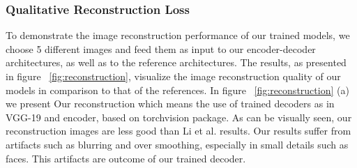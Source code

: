 \subsubsection{Qualitative Reconstruction Loss}
To demonstrate the image reconstruction performance of our trained models, we choose 5 different images and feed them as input to our encoder-decoder architectures, as well as to the reference architectures. The results, as presented in figure ~\ref{fig:reconstruction}, visualize the image reconstruction quality of our models in comparison to that of the references.\newline
In figure ~\ref{fig:reconstruction} (a) we present Our reconstruction which means the use of trained decoders as in VGG-19 \cite{bib20} and encoder, based on torchvision package.
As can be visually seen, our reconstruction images are less good than Li et al. \cite{bib11} results. Our results suffer from artifacts such as blurring and over smoothing, especially in small details such as faces. This artifacts are outcome of our trained decoder.

